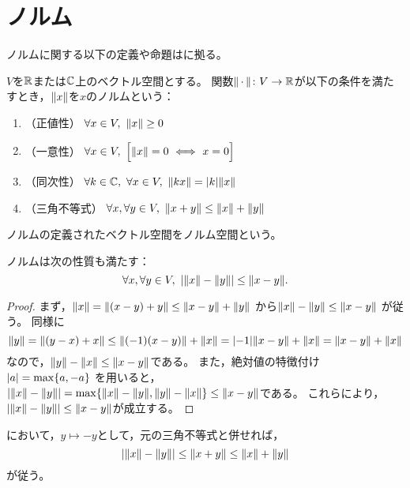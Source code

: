 \documentclass[b5paper,oneside,openany]{ltjsbook} %
\begin{document}
\ifdraft{\tableofcontents}{}
\section{ノルム}
ノルムに関する以下の定義や命題は\cite{nomura}に拠る。

\begin{defi}[ノルム]
    $V$を$\mathbb{R}$または$\mathbb{C}$上のベクトル空間とする。
    関数$\norm{\dummy}\colon V\to \R$が以下の条件を満たすとき，$\norm{x}$を$x$のノルムという：
    \begin{enumerate}[label=(\roman*)]
        \item （正値性） $\forall x\in V,\ \norm{x}\geq 0$
        \item （一意性） $\forall x\in V,\ \bsqu{\norm{x}=0\ \Longleftrightarrow\ x=0}$
        \item （同次性） $\forall k\in \CC,\ \forall x\in V,\ \norm{kx}=\abs{k}\norm{x}$
        \item （三角不等式） $\forall x, \forall y\in V,\ \norm{x+y}\leq \norm{x}+\norm{y}$
    \end{enumerate}
    ノルムの定義されたベクトル空間をノルム空間という。
\end{defi}


\begin{prop}[三角不等式]
    ノルムは次の性質も満たす：
    \begin{equation}
        \forall x, \forall y\in V,\ \abs{\norm{x}-\norm{y}}\leq \norm{x-y}.
    \end{equation}
    \begin{proof}
        まず，$\norm{x}=\norm{\pare{x-y}+y}\leq \norm{x-y}+\norm{y}$
        から$\norm{x}-\norm{y}\leq \norm{x-y}$
        が従う。
        同様に
        \begin{equation}
            \norm{y}=\norm{\pare{y-x}+x}\leq \norm{\pare{-1}\pare{x-y}}+\norm{x}=\abs{-1}\norm{x-y}+\norm{x}=\norm{x-y}+\norm{x}
        \end{equation}
        なので，$\norm{y}-\norm{x}\leq \norm{x-y}$である。
        また，絶対値の特徴付け$\abs{a}= \max\bra{a,-a}$
        を用いると，$\abs{\norm{x}-\norm{y}}= \max\bra{\norm{x}-\norm{y},\norm{y}-\norm{x}}\leq \norm{x-y}$である。
        これらにより，$\abs{\norm{x}-\norm{y}}\leq \norm{x-y}$が成立する。
    \end{proof}
\end{prop}

\begin{cor}
    において，$y\mapsto -y$として，元の三角不等式と併せれば，
    \begin{equation}
        \abs{\norm{x}-\norm{y}}\leq \norm{x+y}\leq \norm{x}+\norm{y}
    \end{equation}
    が従う。
\end{cor}
\end{document}
